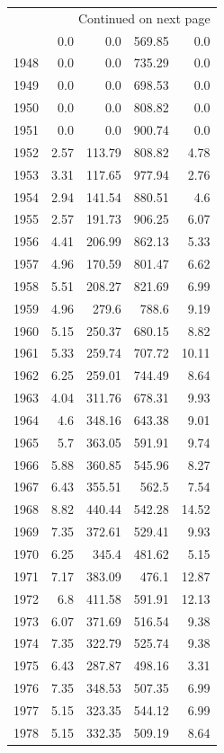\documentclass[a4paper,titlepage]{article}
\begin{document}
\begin{longtable}{rrrrr}
\hline
\endhead
\hline\multicolumn{5}{r}{Continued on next page} \\
\endfoot
\endlastfoot
\hline
1947 & 0.0 & 0.0 & 569.85 & 0.0\\
1948 & 0.0 & 0.0 & 735.29 & 0.0\\
1949 & 0.0 & 0.0 & 698.53 & 0.0\\
1950 & 0.0 & 0.0 & 808.82 & 0.0\\
1951 & 0.0 & 0.0 & 900.74 & 0.0\\
1952 & 2.57 & 113.79 & 808.82 & 4.78\\
1953 & 3.31 & 117.65 & 977.94 & 2.76\\
1954 & 2.94 & 141.54 & 880.51 & 4.6\\
1955 & 2.57 & 191.73 & 906.25 & 6.07\\
1956 & 4.41 & 206.99 & 862.13 & 5.33\\
1957 & 4.96 & 170.59 & 801.47 & 6.62\\
1958 & 5.51 & 208.27 & 821.69 & 6.99\\
1959 & 4.96 & 279.6 & 788.6 & 9.19\\
1960 & 5.15 & 250.37 & 680.15 & 8.82\\
1961 & 5.33 & 259.74 & 707.72 & 10.11\\
1962 & 6.25 & 259.01 & 744.49 & 8.64\\
1963 & 4.04 & 311.76 & 678.31 & 9.93\\
1964 & 4.6 & 348.16 & 643.38 & 9.01\\
1965 & 5.7 & 363.05 & 591.91 & 9.74\\
1966 & 5.88 & 360.85 & 545.96 & 8.27\\
1967 & 6.43 & 355.51 & 562.5 & 7.54\\
1968 & 8.82 & 440.44 & 542.28 & 14.52\\
1969 & 7.35 & 372.61 & 529.41 & 9.93\\
1970 & 6.25 & 345.4 & 481.62 & 5.15\\
1971 & 7.17 & 383.09 & 476.1 & 12.87\\
1972 & 6.8 & 411.58 & 591.91 & 12.13\\
1973 & 6.07 & 371.69 & 516.54 & 9.38\\
1974 & 7.35 & 322.79 & 525.74 & 9.38\\
1975 & 6.43 & 287.87 & 498.16 & 3.31\\
1976 & 7.35 & 348.53 & 507.35 & 6.99\\
1977 & 5.15 & 323.35 & 544.12 & 6.99\\
1978 & 5.15 & 332.35 & 509.19 & 8.64\\

\end{longtable}
\end{document}
